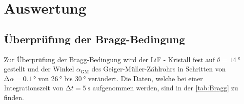 \section{Auswertung}
\label{sec:Auswertung}

\subsection{Überprüfung der Bragg-Bedingung}

Zur Überprüfung der Bragg-Bedingung wird der LiF - Kristall fest auf $\theta = \SI{14}{\degree}$ gestellt und der Winkel $\alpha_{\text{GM}}$ des 
Geiger-Müller-Zählrohrs in Schritten von $\increment \alpha = \SI{0.1}{\degree}$ von $\SI{26}{\degree}$ bis $\SI{30}{\degree}$ verändert. Die Daten, welche bei 
einer Integrationszeit von $\increment t = \SI{5}{\second}$ aufgenommen werden, sind in der \autoref{tab:Bragg} zu finden. 

